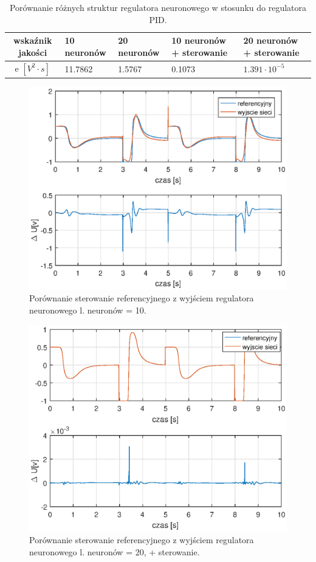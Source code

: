 	\begin{table}[h]
		\caption{Porównanie różnych struktur regulatora neuronowego w stosunku do regulatora PID.}
		\label{optNeural}
		\centering
		
		\begin{tabular}{|c|M{2.5cm}|M{2.5cm}|M{2.5cm}|M{2.5cm}|}
			\hline
			wska\'znik jakości&10 neuronów&20 neuronów&10 neuronów + sterowanie&20 neuronów + sterowanie\\
			\hline
			e $[V^2 \cdot s]$&11.7862 &   1.5767 &   0.1073& $1.391 \cdot 10^{-5}$ \\
			\hline
		\end{tabular}
	\end{table}
	
	
	\begin{figure}[h!]
		\centering
		\includegraphics[scale = 0.8]{fig/10neuron.eps}
		\caption		
		{Porównanie sterowanie referencyjnego z wyjściem regulatora neuronowego l. neuronów = 10.}
		\label{10n}
	\end{figure}

\begin{figure}[h!]
	\centering
	\includegraphics[scale = 0.8]{fig/20neuronU.eps}
	\caption		
	{Porównanie sterowanie referencyjnego z wyjściem regulatora neuronowego l. neuronów = 20, + sterowanie.}
	\label{20nU}
\end{figure}
	
	
	
	
	
	
	
	
	
